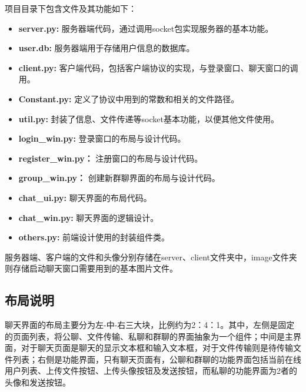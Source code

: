 \documentclass[12pt]{article} %
\begin{document}
\begin{sloppypar}
项目目录下包含文件及其功能如下：
\begin{itemize}
	\item {\bf server.py:} 服务器端代码，通过调用socket包实现服务器的基本功能。\vspace*{-1.5mm}
	\item {\bf user.db:} 服务器端用于存储用户信息的数据库。\vspace*{-1.5mm}
	\item {\bf client.py:} 客户端代码，包括客户端协议的实现，与登录窗口、聊天窗口的调用。\vspace*{-1.5mm}
	\item {\bf Constant.py:} 定义了协议中用到的常数和相关的文件路径。\vspace*{-1.5mm}
	\item {\bf util.py:} 封装了信息、文件传递等socket基本功能，以便其他文件使用。\vspace*{-1.5mm}
	\item {\bf login\_win.py:} 登录窗口的布局与设计代码。\vspace*{-1.5mm}
	\item {\bf register\_win.py：} 注册窗口的布局与设计代码。\vspace*{-1.5mm}
	\item {\bf group\_win.py：} 创建新群聊界面的布局与设计代码。\vspace*{-1.5mm}
	\item {\bf chat\_ui.py:} 聊天界面的布局代码。\vspace*{-1.5mm}
	\item {\bf chat\_win.py:} 聊天界面的逻辑设计。\vspace*{-1.5mm}
	\item {\bf others.py:} 前端设计使用的封装组件类。\vspace*{-1.5mm}
\end{itemize}

服务器端、客户端的文件和头像分别存储在server、client文件夹中，image文件夹则存储启动聊天窗口需要用到的基本图片文件。
\subsection{布局说明}

聊天界面的布局主要分为左-中-右三大块，比例约为2：4：1。其中，左侧是固定的页面列表，将公聊、文件传输、私聊和群聊的界面抽象为一个组件；中间是主界面，对于聊天页面是聊天的显示文本框和输入文本框，对于文件传输则是待传输文件列表；右侧是功能界面，只有聊天页面有，公聊和群聊的功能界面包括当前在线用户列表、上传文件按钮、上传头像按钮及发送按钮，而私聊的功能界面为2者的头像和发送按钮。


\end{sloppypar}
\end{document}
